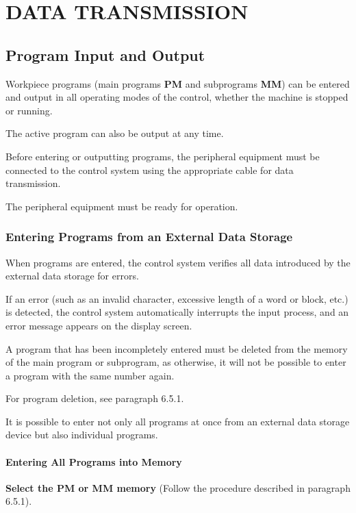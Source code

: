 \chapter{DATA TRANSMISSION}

\section{Program Input and Output}

Workpiece programs (main programs \textbf{PM} and subprograms \textbf{MM}) can be entered and output in all operating modes of the control, whether the machine is stopped or running.

The active program can also be output at any time.

Before entering or outputting programs, the peripheral equipment must be connected to the control system using the appropriate cable for data transmission.

The peripheral equipment must be ready for operation.

\subsection{Entering Programs from an External Data Storage}

When programs are entered, the control system verifies all data introduced by the external data storage for errors.

If an error (such as an invalid character, excessive length of a word or block, etc.) is detected, the control system automatically interrupts the input process, and an error message appears on the display screen.

A program that has been incompletely entered must be deleted from the memory of the main program or subprogram, as otherwise, it will not be possible to enter a program with the same number again.

For program deletion, see paragraph 6.5.1.

It is possible to enter not only all programs at once from an external data storage device but also individual programs.

\newpage

\subsubsection{Entering All Programs into Memory}

\textbf{Select the PM or MM memory}  
(Follow the procedure described in paragraph 6.5.1).

